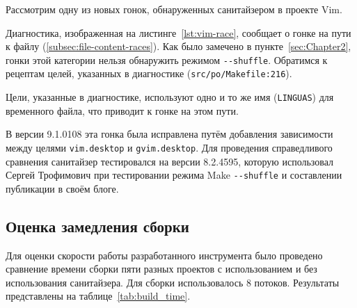 Рассмотрим одну из новых гонок, обнаруженных санитайзером в проекте Vim.

\begin{figure}[H]

\end{figure}

Диагностика, изображенная на листинге~\ref{lst:vim-race}, сообщает о гонке на пути к файлу (\ref{subsec:file-content-races}). Как было замечено в пункте~\ref{sec:Chapter2}, гонки этой категории нельзя обнаружить режимом \texttt{-{}-shuffle}. Обратимся к рецептам целей, указанных в диагностике (\texttt{src/po/Makefile:216}).

\begin{figure}[H]

\end{figure}

Цели, указанные в диагностике, используют одно и то же имя (\texttt{LINGUAS}) для временного файла, что приводит к гонке на этом пути.

В версии 9.1.0108 эта гонка была исправлена путём добавления зависимости между целями \texttt{vim.desktop} и \texttt{gvim.desktop}. Для проведения справедливого сравнения санитайзер тестировался на версии 8.2.4595, которую использовал Сергей Трофимович при тестировании режима Make \texttt{-{}-shuffle} и составлении публикации в своём блоге.

\subsection{Оценка замедления сборки}

Для оценки скорости работы разработанного инструмента было проведено сравнение времени сборки пяти разных проектов с использованием и без использования санитайзера. Для сборки использовалось 8 потоков. Результаты представлены на таблице~\ref{tab:build_time}.

